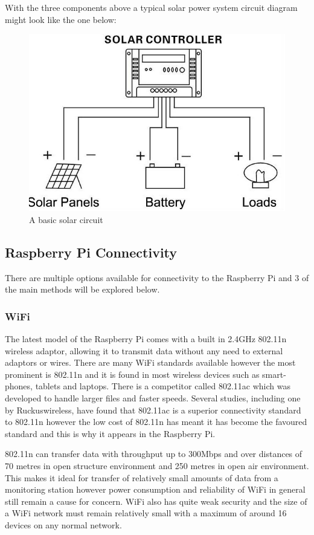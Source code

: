 \documentclass[10pt,a4paper]{article}
\begin{document}
With the three components above a typical solar power system circuit diagram might look like the one below: 

\begin{figure}[H]
\centering
  \includegraphics[width=\linewidth]{images/solarcircuit.jpg}
  \caption{A basic solar circuit\cite{website:edgefx}}
  \label{fig:solarcircuit}
\end{figure}

\subsection{Raspberry Pi Connectivity}
There are multiple options available for connectivity to the Raspberry Pi and 3 of the main methods will be explored below.
\subsubsection{WiFi} 
The latest model of the Raspberry Pi comes with a built in 2.4GHz 802.11n wireless adaptor, allowing it to transmit data without any need to external adaptors or wires. There are many WiFi standards available however the most prominent is 802.11n and it is found in most wireless devices such as smart-phones, tablets and laptops. There is a competitor called 802.11ac which was developed to handle larger files and faster speeds. Several studies, including one by Ruckuswireless\cite{Ruckus2014}, have found that 802.11ac is a superior connectivity standard to 802.11n however the low cost of 802.11n has meant it has become the favoured standard and this is why it appears in the Raspberry Pi. 

802.11n can transfer data with throughput up to 300Mbps and over distances of 70 metres in open structure environment and 250 metres in open air environment\cite{Kaewkiriya2017}. This makes it ideal for transfer of relatively small amounts of data from a monitoring station however power consumption and reliability of WiFi in general still remain a cause for concern. WiFi also has quite weak security and the size of a WiFi network must remain relatively small with a maximum of around 16 devices on any normal network.  
\end{document}
